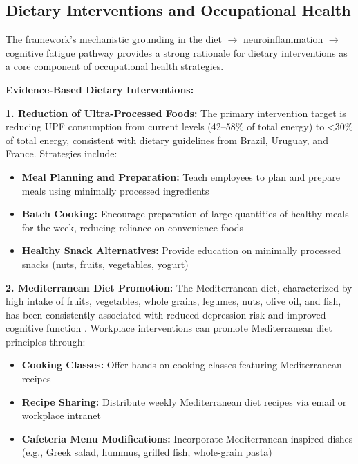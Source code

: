 \documentclass[journal,twoside,10pt]{IEEEtran}
\begin{document}
\subsection{Dietary Interventions and Occupational Health}

The framework's mechanistic grounding in the diet $\rightarrow$ neuroinflammation $\rightarrow$ cognitive fatigue pathway provides a strong rationale for dietary interventions as a core component of occupational health strategies.

\textbf{Evidence-Based Dietary Interventions:}

\textbf{1. Reduction of Ultra-Processed Foods:}
The primary intervention target is reducing UPF consumption from current levels (42--58\% of total energy) to <30\% of total energy, consistent with dietary guidelines from Brazil, Uruguay, and France. Strategies include:
\begin{itemize}
\item \textbf{Meal Planning and Preparation:} Teach employees to plan and prepare meals using minimally processed ingredients
\item \textbf{Batch Cooking:} Encourage preparation of large quantities of healthy meals for the week, reducing reliance on convenience foods
\item \textbf{Healthy Snack Alternatives:} Provide education on minimally processed snacks (nuts, fruits, vegetables, yogurt)
\end{itemize}

\textbf{2. Mediterranean Diet Promotion:}
The Mediterranean diet, characterized by high intake of fruits, vegetables, whole grains, legumes, nuts, olive oil, and fish, has been consistently associated with reduced depression risk and improved cognitive function \cite{ref31,ref51,ref52,ref54}. Workplace interventions can promote Mediterranean diet principles through:
\begin{itemize}
\item \textbf{Cooking Classes:} Offer hands-on cooking classes featuring Mediterranean recipes
\item \textbf{Recipe Sharing:} Distribute weekly Mediterranean diet recipes via email or workplace intranet
\item \textbf{Cafeteria Menu Modifications:} Incorporate Mediterranean-inspired dishes (e.g., Greek salad, hummus, grilled fish, whole-grain pasta)
\end{itemize}
\end{document}
